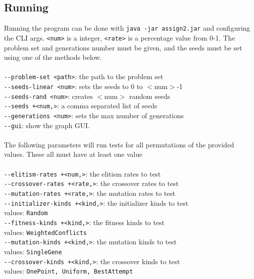 \documentclass[conference]{IEEEtran}
\begin{document}
\subsection{Running}
Running the program can be done with \texttt{java -jar assign2.jar} and configuring the CLI args. \texttt{<num>} is a integer, \texttt{<rate>} is a percentage value from 0-1. The problem set and generations number must be given, and the seeds must be set using one of the methods below.\\\\
\small
\texttt{-{}-problem-set <path>}: the path to the problem set\\
\texttt{-{}-seeds-linear <num>}: sets the seeds to 0 to $<$num$>$-1\\
\texttt{-{}-seeds-rand <num>}: creates $<$num$>$ random seeds\\
\texttt{-{}-seeds +<num,>}: a comma separated list of seeds\\
\texttt{-{}-generations <num>}: sets the max number of generations\\
\texttt{-{}-gui}: show the graph GUI.\\
\normalsize
\\
The following parameters will run tests for all permutations of the provided values. These all must have at least one value\\\\
\small
\texttt{-{}-elitism-rates +<num,>}: the elitism rates to test\\
\texttt{-{}-crossover-rates +<rate,>}: the crossover rates to test\\
\texttt{-{}-mutation-rates +<rate,>}: the mutation rates to test\\
\texttt{-{}-initializer-kinds +<kind,>}: the initializer kinds to test\\
\hspace*{10pt}values: \texttt{Random}\\
\texttt{-{}-fitness-kinds +<kind,>}: the fitness kinds to test\\
\hspace*{10pt}values: \texttt{WeightedConflicts}\\
\texttt{-{}-mutation-kinds +<kind,>}: the mutation kinds to test\\
\hspace*{10pt}values: \texttt{SingleGene}\\
\texttt{-{}-crossover-kinds +<kind,>}: the crossover kinds to test\\
\hspace*{10pt}values: \texttt{OnePoint, Uniform, BestAttempt}\\
\normalsize
\vspace{8pt}
\end{document}
